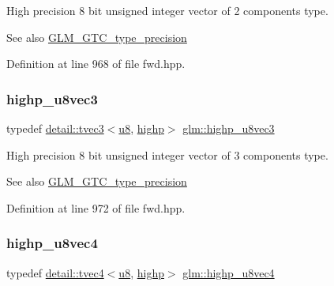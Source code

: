 High precision 8 bit unsigned integer vector of 2 components type. \begin{DoxySeeAlso}{See also}
\hyperlink{group__gtc__type__precision}{G\+L\+M\+\_\+\+G\+T\+C\+\_\+type\+\_\+precision} 
\end{DoxySeeAlso}


Definition at line 968 of file fwd.\+hpp.

\mbox{\label{group__gtc__type__precision_ga52bdf53a4f05023c13a9b817526d249f}} 
\subsubsection{\texorpdfstring{highp\+\_\+u8vec3}{highp\_u8vec3}}
{\footnotesize\ttfamily typedef \hyperlink{structglm_1_1detail_1_1tvec3}{detail\+::tvec3}$<$\hyperlink{group__gtc__type__precision_ga5e3dc67373d5068997d2d9f41c9024d2}{u8}, \hyperlink{namespaceglm_a0f04f086094c747d227af4425893f545ac6f7eab42eacbb10d59a58e95e362074}{highp}$>$ \hyperlink{group__gtc__type__precision_ga52bdf53a4f05023c13a9b817526d249f}{glm\+::highp\+\_\+u8vec3}}

High precision 8 bit unsigned integer vector of 3 components type. \begin{DoxySeeAlso}{See also}
\hyperlink{group__gtc__type__precision}{G\+L\+M\+\_\+\+G\+T\+C\+\_\+type\+\_\+precision} 
\end{DoxySeeAlso}


Definition at line 972 of file fwd.\+hpp.

\mbox{\label{group__gtc__type__precision_ga3a46f19674a65471988b41ffdaa834c5}} 
\subsubsection{\texorpdfstring{highp\+\_\+u8vec4}{highp\_u8vec4}}
{\footnotesize\ttfamily typedef \hyperlink{structglm_1_1detail_1_1tvec4}{detail\+::tvec4}$<$\hyperlink{group__gtc__type__precision_ga5e3dc67373d5068997d2d9f41c9024d2}{u8}, \hyperlink{namespaceglm_a0f04f086094c747d227af4425893f545ac6f7eab42eacbb10d59a58e95e362074}{highp}$>$ \hyperlink{group__gtc__type__precision_ga3a46f19674a65471988b41ffdaa834c5}{glm\+::highp\+\_\+u8vec4}}

